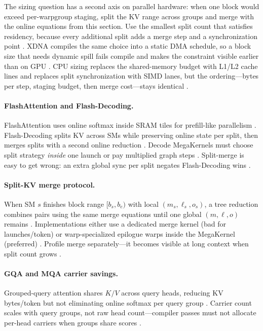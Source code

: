 The sizing question has a second axis on parallel hardware: when one block would exceed per-warpgroup staging, split the KV range across groups and merge with the online equations from this section. Use the smallest split count that satisfies residency, because every additional split adds a merge step and a synchronization point \citep{dao2023flashdecoding,patel2025llminference}. XDNA compiles the same choice into a static DMA schedule, so a block size that needs dynamic spill fails compile and makes the constraint visible earlier than on GPU \citep{amd2024aie,amd2024xdna}. CPU sizing replaces the shared-memory budget with L1/L2 cache lines and replaces split synchronization with SIMD lanes, but the ordering---bytes per step, staging budget, then merge cost---stays identical \citep{dlbook,yirage2026}.

\paragraph{FlashAttention and Flash-Decoding.} FlashAttention uses online softmax inside SRAM tiles for prefill-like parallelism \citep{dao2022flashattention}. Flash-Decoding splits KV across SMs while preserving online state per split, then merges splits with a second online reduction \citep{dao2023flashdecoding}. Decode MegaKernels must choose split strategy \emph{inside} one launch or pay multiplied graph steps \citep{taxbreak2026,nvidia2024cudagraphs}. Split-merge is easy to get wrong: an extra global sync per split negates Flash-Decoding wins \citep{patel2025llminference}.

\paragraph{Split-KV merge protocol.} When SM $s$ finishes block range $[b_s, b_e)$ with local $(m_s,\ell_s,o_s)$, a tree reduction combines pairs using the same merge equations until one global $(m,\ell,o)$ remains \citep{dao2023flashdecoding}. Implementations either use a dedicated merge kernel (bad for launches/token) or warp-specialized epilogue warps inside the MegaKernel (preferred) \citep{taxbreak2026,yirage2026}. Profile merge separately---it becomes visible at long context when split count grows \citep{patel2025llminference}.

\paragraph{GQA and MQA carrier savings.} Grouped-query attention shares $K/V$ across query heads, reducing KV bytes/token but not eliminating online softmax per query group \citep{liu2024deepseekv3,kwon2023vllm}. Carrier count scales with query groups, not raw head count---compiler passes must not allocate per-head carriers when groups share scores \citep{yirage2026,chen2020compilerbasedhardw}.

